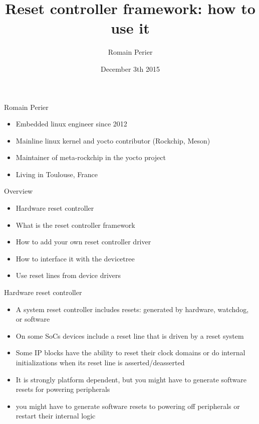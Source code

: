 \documentclass{beamer}
\title{Reset controller framework: how to use it}
\author{Romain Perier}
\institute{Embedded linux engineer and foss developer\newline romain.perier@gmail.com}
\date{December 3th 2015}
\begin{document}
\begin{frame}
\titlepage{}
\end{frame}

\begin{frame}{Romain Perier}
	\begin{itemize}
		\item Embedded linux engineer since 2012
		\item Mainline linux kernel and yocto contributor (Rockchip, Meson)
		\item Maintainer of meta-rockchip in the yocto project
		\item Living in Toulouse, France
	\end{itemize}
\end{frame}

\begin{frame}{Overview}
	\begin{itemize}
		\item Hardware reset controller
		\item What is the reset controller framework
		\item How to add your own reset controller driver
		\item How to interface it with the devicetree
		\item Use reset lines from device drivers
	\end{itemize}
\end{frame}

\begin{frame}{Hardware reset controller}
	\begin{itemize}
		\item A system reset controller includes resets: generated by hardware, watchdog, or software
		\item On some SoCs devices include a reset line that is driven by a reset system
		\item Some IP blocks have the ability to reset their clock domains or do internal initializations when its reset line is asserted/deasserted
		\item It is strongly platform dependent, but you might have to generate software resets for powering peripherals
		\item you might have to generate software resets to powering off peripherals or restart their internal logic
	\end{itemize}
\end{frame}
\end{document}
